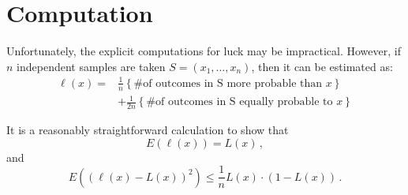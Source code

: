 \chapter*{Computation}

Unfortunately, the explicit computations for luck may be impractical.  However, if $n$ independent samples are taken $S=(x_1, \ldots, x_n)$, then it can be estimated as: 
\begin{align*}
 \ell(x) = & \frac{1}{n} \left\{\text{\# of outcomes in S more probable than $x$}\right\}  \\
 & + \frac{1}{2n} \left\{\text{\# of outcomes in S equally probable to $x$}\right\} 
\end{align*}

It is a reasonably straightforward calculation to show that
\begin{equation}
E(\ell(x))=L(x) \,,
\end{equation}
and
\begin{equation}
E((\ell(x)-L(x))^2) \leq \frac{1}{n} L(x) \cdot (1-L(x))\,.
\end{equation}

